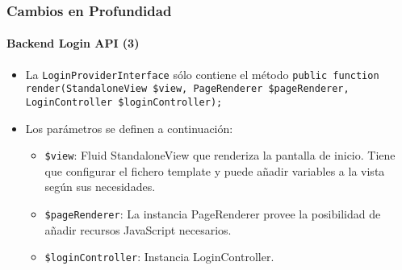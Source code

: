\begin{frame}[fragile]
	\frametitle{Cambios en Profundidad}
	\framesubtitle{Backend Login API (3)}

	\begin{itemize}

		\item La \texttt{LoginProviderInterface} sólo contiene el método\newline
			\smaller\texttt{public function render(StandaloneView \$view, PageRenderer \$pageRenderer, LoginController \$loginController);}\normalsize

		\item Los parámetros se definen a continuación:

			\begin{itemize}

				\item \texttt{\$view}:\newline
					Fluid StandaloneView que renderiza la pantalla de inicio. Tiene que configurar
					el fichero template y puede añadir variables a la vista
					según sus necesidades.

				\item \texttt{\$pageRenderer}:\newline
					La instancia PageRenderer provee la posibilidad de añadir recursos JavaScript necesarios.

				\item \texttt{\$loginController}:\newline
					Instancia LoginController.

			\end{itemize}

	\end{itemize}

\end{frame}


